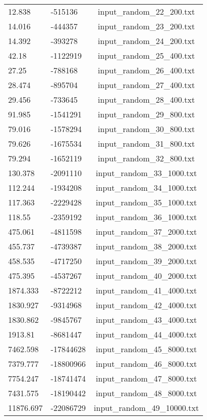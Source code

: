 \begin{longtable}[hb]{|l|l|c|}
    12.838 & -515136 & input\_random\_22\_200.txt \\
    14.016 & -444357 & input\_random\_23\_200.txt \\
    14.392 & -393278 & input\_random\_24\_200.txt \\
    42.18 & -1122919 & input\_random\_25\_400.txt \\
    27.25 & -788168 & input\_random\_26\_400.txt \\
    28.474 & -895704 & input\_random\_27\_400.txt \\
    29.456 & -733645 & input\_random\_28\_400.txt \\
    91.985 & -1541291 & input\_random\_29\_800.txt \\
    79.016 & -1578294 & input\_random\_30\_800.txt \\
    79.626 & -1675534 & input\_random\_31\_800.txt \\
    79.294 & -1652119 & input\_random\_32\_800.txt \\
    130.378 & -2091110 & input\_random\_33\_1000.txt \\
    112.244 & -1934208 & input\_random\_34\_1000.txt \\
    117.363 & -2229428 & input\_random\_35\_1000.txt \\
    118.55 & -2359192 & input\_random\_36\_1000.txt \\
    475.061 & -4811598 & input\_random\_37\_2000.txt \\
    455.737 & -4739387 & input\_random\_38\_2000.txt \\
    458.535 & -4717250 & input\_random\_39\_2000.txt \\
    475.395 & -4537267 & input\_random\_40\_2000.txt \\
    1874.333 & -8722212 & input\_random\_41\_4000.txt \\
    1830.927 & -9314968 & input\_random\_42\_4000.txt \\
    1830.862 & -9845767 & input\_random\_43\_4000.txt \\
    1913.81 & -8681447 & input\_random\_44\_4000.txt \\
    7462.598 & -17844628 & input\_random\_45\_8000.txt \\
    7379.777 & -18800966 & input\_random\_46\_8000.txt \\
    7754.247 & -18741474 & input\_random\_47\_8000.txt \\
    7431.575 & -18190442 & input\_random\_48\_8000.txt \\
    11876.697 & -22086729 & input\_random\_49\_10000.txt \\

\end{longtable}
